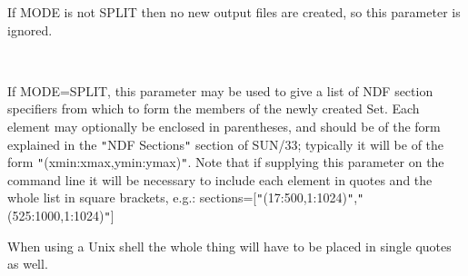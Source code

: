 \documentclass[twoside,11pt]{article}
\newcommand{\xref}[3]{#1}
\renewcommand{\_}{\texttt{\symbol{95}}}
\newcommand{\sstsubsection}[1]{ \item[{#1}] \mbox{} \\}
\newcommand{\sstsubsection}[1]{\item[{#1}]}
\begin{document}
{{{         If MODE is not SPLIT then no new output files are created, so
         this parameter is ignored.
      }
      \sstsubsection{
         SECTIONS( $*$ ) = LITERAL (Read)
      }{
         If MODE=SPLIT, this parameter may be used to give a list
         of NDF section specifiers from which to form the members of
         the newly created Set.  Each element may optionally be
         enclosed in parentheses, and should be of the form
         explained in the {\tt "}\xref{NDF Sections}{sun33}{ndf_sections}{\tt "} section of \xref{SUN/33}{sun33}{};
         typically it will be of the form {\tt "}(xmin:xmax,ymin:ymax){\tt "}.
         Note that if supplying this parameter on the command line
         it will be necessary to include each element in quotes and
         the whole list in square brackets, e.g.:
            sections=[{\tt "}(17:500,1:1024){\tt "},{\tt "}(525:1000,1:1024){\tt "}]

         When using a Unix shell the whole thing will have to be
         placed in single quotes as well.

}}}
\end{document}
